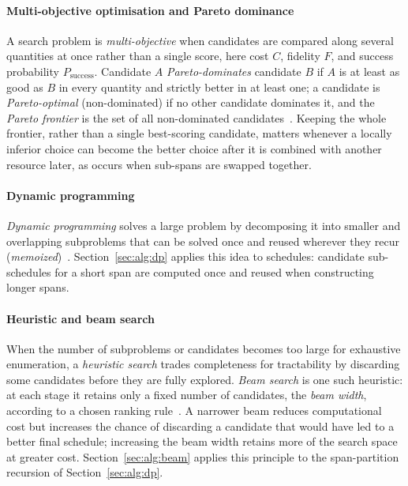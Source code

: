 \paragraph{Multi-objective optimisation and Pareto dominance} A search problem is \emph{multi-objective} when candidates are compared along several quantities at once rather than a single score, here cost $C$, fidelity $F$, and success probability $P_{\mathrm{success}}$. Candidate $A$ \emph{Pareto-dominates} candidate $B$ if $A$ is at least as good as $B$ in every quantity and strictly better in at least one; a candidate is \emph{Pareto-optimal} (non-dominated) if no other candidate dominates it, and the \emph{Pareto frontier} is the set of all non-dominated candidates~\cite{Pareto2014Manual,Deb2002Fast,Ehrgott2005Multicriteria}. Keeping the whole frontier, rather than a single best-scoring candidate, matters whenever a locally inferior choice can become the better choice after it is combined with another resource later, as occurs when sub-spans are swapped together.

\paragraph{Dynamic programming} \emph{Dynamic programming} solves a large problem by decomposing it into smaller and overlapping subproblems that can be solved once and reused wherever they recur (\emph{memoized})~\cite{Bellman2003Dynamic}. Section~\ref{sec:alg:dp} applies this idea to schedules: candidate sub-schedules for a short span are computed once and reused when constructing longer spans.

\paragraph{Heuristic and beam search} When the number of subproblems or candidates becomes too large for exhaustive enumeration, a \emph{heuristic search} trades completeness for tractability by discarding some candidates before they are fully explored. \emph{Beam search} is one such heuristic: at each stage it retains only a fixed number of candidates, the \emph{beam width}, according to a chosen ranking rule~\cite{Lowerre1990HARPY,Huang2018When,Meister2022BestFirst}. A narrower beam reduces computational cost but increases the chance of discarding a candidate that would have led to a better final schedule; increasing the beam width retains more of the search space at greater cost. Section~\ref{sec:alg:beam} applies this principle to the span-partition recursion of Section~\ref{sec:alg:dp}.

